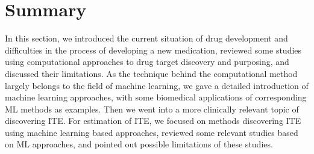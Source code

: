   \section{Summary}
    In this section, we introduced the current situation of drug development and difficulties in the process of developing a new medication, reviewed some studies using computational approaches to drug target discovery and purposing, and discussed their limitations. As the technique behind the computational method largely belongs to the field of machine learning, we gave a detailed introduction of machine learning approaches, with some biomedical applications of corresponding ML methods as examples. Then we went into a more clinically relevant topic of discovering ITE. For estimation of ITE, we focused on methods discovering ITE using machine learning based approaches, reviewed some relevant studies based on ML approaches, and pointed out possible limitations of these studies.
     
\chapterend
